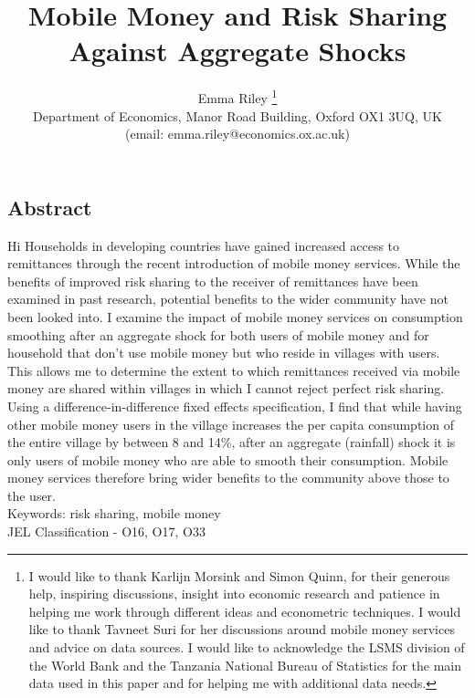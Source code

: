\documentclass[a4paper]{article}
\begin{document}
\begin{titlepage}
\title{Mobile Money and Risk Sharing Against Aggregate Shocks}
\author{Emma Riley \footnote{I would like to thank  Karlijn Morsink and Simon Quinn, for their generous help, inspiring discussions, insight into economic research and patience in helping me work through different ideas and econometric techniques. I would like to thank Tavneet Suri for her discussions around mobile money services and advice on data sources. I would like to acknowledge the LSMS division of the World Bank and the Tanzania National Bureau of Statistics for the main data used in this paper and for helping me with additional data needs.} \\ Department of Economics, Manor Road Building, Oxford OX1 3UQ, UK \\ (email: emma.riley@economics.ox.ac.uk)}
\thispagestyle{empty}
\maketitle 
\begin{center}
\section*{Abstract}
\end{center}
Hi
Households in developing countries have gained increased access to remittances through the recent introduction of mobile money services. While the benefits of improved risk sharing to the receiver of remittances have been examined in past research, potential benefits to the wider community have not been looked into. I examine the impact of mobile money services on consumption smoothing after an aggregate shock for both users of mobile money and for household that don't use mobile money but who reside in villages with users. This allows me to determine the extent to which remittances received via mobile money are shared within villages in which I cannot reject perfect risk sharing. Using a difference-in-difference fixed effects specification, I find that while having other mobile money users in the village increases the per capita consumption of the entire village by between  8 and 14\%, after an aggregate (rainfall) shock it is only users of mobile money who are able to smooth their consumption. Mobile money services therefore bring wider benefits to the community above those to the user. \\

\noindent Keywords: risk sharing, mobile money \\
JEL Classification - O16, O17, O33
\thispagestyle{empty}



\end{titlepage}
\end{document}

